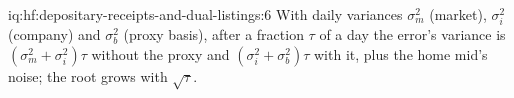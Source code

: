 \begin{solution}{iq:hf:depositary-receipts-and-dual-listings:6}
With daily variances $\sigma_m^2$ (market), $\sigma_i^2$ (company) and $\sigma_b^2$ (proxy basis), after a fraction $\tau$ of a day the error's
variance is $(\sigma_m^2+\sigma_i^2)\tau$ without the proxy and $(\sigma_i^2+\sigma_b^2)\tau$ with it, plus the home mid's noise; the root grows with
$\sqrt\tau$.
\end{solution}
